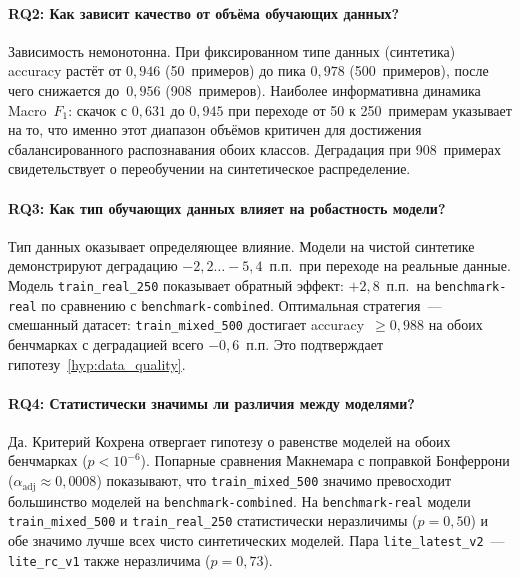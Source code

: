 \paragraph{\textsc{RQ2}: Как зависит качество от объёма обучающих данных?}

Зависимость немонотонна. При фиксированном типе данных (синтетика) accuracy растёт от $0{,}946$ (50~примеров) до пика $0{,}978$ (500~примеров), после чего снижается до~$0{,}956$ (908~примеров). Наиболее информативна динамика Macro~$F_1$: скачок с $0{,}631$ до $0{,}945$ при переходе от 50 к 250~примерам указывает на то, что именно этот диапазон объёмов критичен для достижения сбалансированного распознавания обоих классов. Деградация при 908~примерах свидетельствует о переобучении на синтетическое распределение.

\paragraph{\textsc{RQ3}: Как тип обучающих данных влияет на робастность модели?}

Тип данных оказывает определяющее влияние. Модели на чистой синтетике демонстрируют деградацию $-2{,}2\ldots -5{,}4$~п.п.\ при переходе на реальные данные. Модель \texttt{train\_real\_250} показывает обратный эффект: $+2{,}8$~п.п.\ на \texttt{benchmark-real} по сравнению с \texttt{benchmark-combined}. Оптимальная стратегия~--- смешанный датасет: \texttt{train\_mixed\_500} достигает accuracy~$\geq 0{,}988$ на обоих бенчмарках с деградацией всего $-0{,}6$~п.п. Это подтверждает гипотезу~\ref{hyp:data_quality}.

\paragraph{\textsc{RQ4}: Статистически значимы ли различия между моделями?}

Да. Критерий Кохрена отвергает гипотезу о равенстве моделей на обоих бенчмарках ($p < 10^{-6}$). Попарные сравнения Макнемара с поправкой Бонферрони ($\alpha_{\mathrm{adj}} \approx 0{,}0008$) показывают, что \texttt{train\_mixed\_500} значимо превосходит большинство моделей на \texttt{benchmark-combined}. На \texttt{benchmark-real} модели \texttt{train\_mixed\_500} и \texttt{train\_real\_250} статистически неразличимы ($p = 0{,}50$) и обе значимо лучше всех чисто синтетических моделей. Пара \texttt{lite\_latest\_v2}~--- \texttt{lite\_rc\_v1} также неразличима ($p = 0{,}73$).

\clearpage
